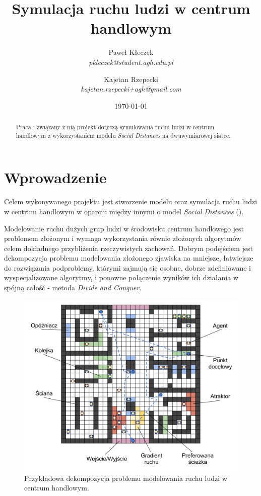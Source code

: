 \documentclass[a4paper, 12pt]{article}
\title{\textbf{Symulacja ruchu ludzi w centrum handlowym}}
\author{Paweł Kłeczek \\ \emph{pkleczek@student.agh.edu.pl} \and Kajetan Rzepecki \\ \emph{kajetan.rzepecki+agh@gmail.com}}
\date{\today}
\begin{document}
    \maketitle

    \vfill
    \begin{abstract}

\noindent
Praca i związany z nią projekt dotyczą symulowania ruchu ludzi w centrum handlowym z wykorzystaniem modelu \emph{Social Distances} na dwuwymiarowej siatce.
    \end{abstract}
    \vfill

    \thispagestyle{empty} %

\newpage
    \setcounter{page}{1}
    \setcounter{tocdepth}{3}

    \tableofcontents

\newpage
    \section{Wprowadzenie}
    \label{sec:intro}

\noindent
Celem wykonywanego projektu jest stworzenie modelu oraz symulacja ruchu ludzi w centrum handlowym w oparciu między innymi o model \emph{Social Distances} (\cite{refs:social-distances-1, refs:social-distances-2}).

Modelowanie ruchu dużych grup ludzi w środowisku centrum handlowego jest problemem złożonym i wymaga wykorzystania równie złożonych algorytmów celem dokładnego przybliżenia rzeczywistych zachowań. Dobrym podejściem jest dekompozycja problemu modelowania złożonego zjawiska na mniejsze, łatwiejsze do rozwiązania podproblemy, którymi zajmują się osobne, dobrze zdefiniowane i wyspecjalizowane algorytmy, i ponowne połączenie wyników ich działania w spójną całość - metoda \emph{Divide and Conquer}.

    \begin{figure}[H]
        \centering
        \includegraphics[scale=0.3]{./img/Overview.pdf}
        \caption{Przykładowa dekompozycja problemu modelowania ruchu ludzi w centrum handlowym.}
        \label{fig:decomp}
    \end{figure}
\end{document}
